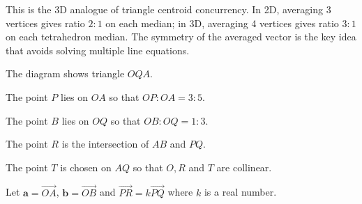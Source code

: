 \begin{takeaways}
This is the 3D analogue of triangle centroid concurrency. In 2D, averaging 3 vertices gives ratio $2:1$ on each median; in 3D, averaging 4 vertices gives ratio $3:1$ on each tetrahedron median. The symmetry of the averaged vector is the key idea that avoids solving multiple line equations.
\end{takeaways}

\vspace{1em}

\begin{problem}
The diagram shows triangle $OQA$.

The point $P$ lies on $OA$ so that $OP : OA = 3 : 5$.

The point $B$ lies on $OQ$ so that $OB : OQ = 1 : 3$.

The point $R$ is the intersection of $AB$ and $PQ$.

The point $T$ is chosen on $AQ$ so that $O, R$ and $T$ are collinear.

Let $\mathbf{a} = \overrightarrow{OA}$, $\mathbf{b} = \overrightarrow{OB}$ and $\overrightarrow{PR} = k\overrightarrow{PQ}$ where $k$ is a real number.

\begin{center}
\end{center}
\end{problem}
